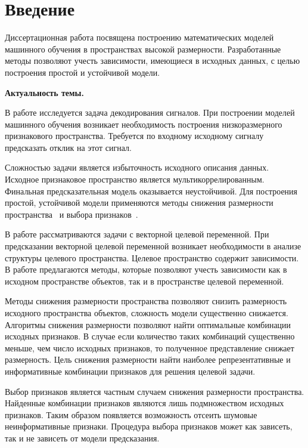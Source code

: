 \chapter*{Введение}

Диссертационная работа посвящена построению математических моделей машинного обучения в пространствах высокой размерности.
Разработанные методы позволяют учесть зависимости, имеющиеся в исходных данных, с целью построения простой и устойчивой модели.


\textbf{Актуальность темы.} 

В работе исследуется задача декодирования сигналов. 
При построении моделей машинного обучения возникает необходимость построения низкоразмерного признакового пространства. 
Требуется по входному исходному сигналу предсказать отклик на этот сигнал.

Сложностью задачи является избыточность исходного описания данных. 
Исходное признаковое пространство является мультикоррелированным.
Финальная предсказательная модель оказывается неустойчивой.
Для построения простой, устойчивой модели применяются методы снижения размерности пространства~\cite{chun2010sparse,mehmood2012review}  и выбора признаков~\cite{katrutsa2015stress,li2017feature}.

В работе рассматриваются задачи с векторной целевой переменной. 
При предсказании векторной целевой переменной возникает необходимости в анализе структуры целевого пространства.
Целевое пространство содержит зависимости.
В работе предлагаются методы, которые позволяют учесть зависимости как в исходном пространстве объектов, так и в пространстве целевой переменной.

Методы снижения размерности пространства позволяют снизить размерность исходного пространства объектов, сложность модели существенно снижается. 
Алгоритмы снижения размерности позволяют найти оптимальные комбинации исходных признаков. 
В случае если количество таких комбинаций существенно меньше, чем число исходных признаков, то полученное представление снижает размерность.
Цель снижения размерности найти наиболее репрезентативные и информативные комбинации признаков для решения целевой задачи.

Выбор признаков является частным случаем снижения размерности пространства. 
Найденные комбинации признаков являются лишь подмножеством исходных признаков.
Таким образом появляется возможность отсеить шумовые неинформативные признаки.
Процедура выбора признаков может как зависеть, так и не зависеть от модели предсказания.

